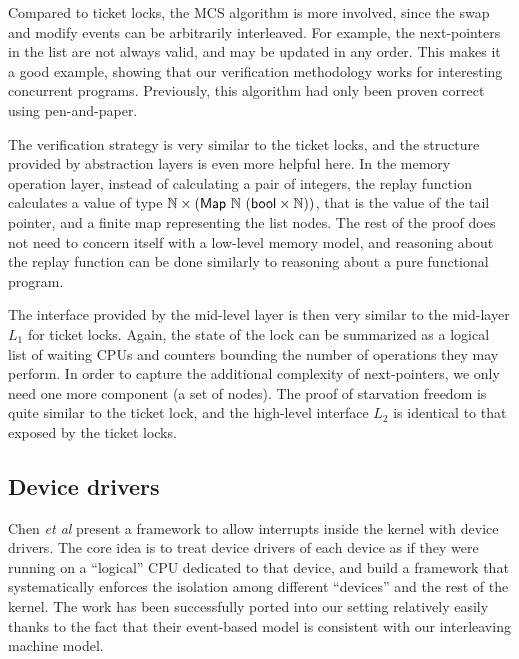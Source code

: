 {%
\ignore{
\begin{figure}
 = C, multicols=2] {source_code/mcs_lock.c}
\caption{Pseudocode of MCS-lock implementation.}
\label{fig:exp:mcs_lock}
\end{figure}
}


Compared to ticket locks, the MCS algorithm is more involved, since
the swap and modify events can be arbitrarily interleaved. For
example, the next-pointers in the list are not always valid, and may
be updated in any order.  This makes it a good example, showing that
our verification methodology works for interesting concurrent
programs. Previously, this algorithm had only been proven correct
using pen-and-paper.

The verification strategy is very similar to the ticket locks,
and the structure provided by abstraction layers is even more helpful here. In the
memory operation layer, instead of calculating a pair of integers, the
replay function calculates a value of type 
$\integer \times (\mathsf{Map}\ \integer\ (\mathsf{bool}\times \integer))$, that is
the value of the tail pointer, and a finite map representing the list
nodes.  The rest of the proof does not need to concern itself
with a low-level memory model, and reasoning about the
replay function can be done similarly to reasoning about a pure
functional program.

The interface provided by the mid-level layer is then very similar to
the mid-layer $L_1$ for ticket locks. Again, the state of the lock
can be summarized as a logical list of waiting CPUs and counters
bounding the number of operations they may perform. In order to capture the
additional complexity of next-pointers, we only need one more
component (a set of nodes). The proof of starvation freedom is quite
similar to the ticket lock, and the high-level interface $L_2$ is
identical to that exposed by the ticket locks.


\ignore{
\begin{figure}
 = C, multicols=2] {source_code/mcs_lock.c}
\caption{MCS Lock Implementation}
\label{fig:exp:mcs_lock}
\end{figure}
}

\subsection{Device drivers}
\label{sec:con:device}
Chen {\it et al} \cite{chen16} present a framework to allow interrupts
inside the kernel
with device drivers. The core idea is to treat device drivers of
each device as if they were running on a ``logical'' CPU dedicated to that device,
and build a framework that systematically enforces the isolation among different
``devices'' and the rest of the kernel. The work has been successfully ported
into our setting relatively easily thanks to the fact that their event-based
 model is consistent with our interleaving machine model.


}
